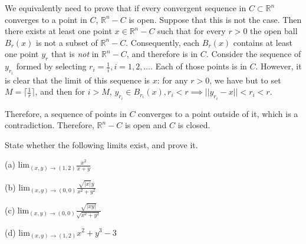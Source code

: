 \begin{solution}

    We equivalently need to prove that if every convergent sequence in $C \subset \mathbb{R}^n$ converges to a point in $C$, $\mathbb{R}^n - C$ is open. Suppose that this is not the case. Then there exists at least one point $x \in \mathbb{R}^n - C$ such that for every $r > 0$ the open ball $B_r(x)$ is not a subset of $\mathbb{R}^n - C$. Consequently, each $B_r(x)$ contains at least one point $y_r$ that is \textit{not} in $\mathbb{R}^n - C$, and therefore is in $C$. Consider the sequence of $y_{r_i}$ formed by selecting $r_i = \frac{1}{i}, i =1, 2, \ldots$. Each of those points is in $C$. However, it is clear that the limit of this sequence is $x$: for any $r > 0$, we have but to set $M = \lceil \frac{1}{r} \rceil$, and then for $i > M$, $y_{r_i} \in B_{r_i}(x), r_i < r \implies \lvert \lvert y_{r_i} - x \rvert \rvert < r_i < r$.

    Therefore, a sequence of points in $C$ converges to a point outside of it, which is a contradiction. Therefore, $\mathbb{R}^n - C$ is open and $C$ is closed.
\end{solution}

\begin{exercise}{14}
    State whether the following limits exist, and prove it.

    (a) $\text{lim}_{(x, y) \rightarrow (1, 2)} \frac{x^2}{x + y}$

    (b) $\text{lim}_{(x, y) \rightarrow (0, 0)} \frac{\sqrt{\lvert x \rvert}y}{x^2 + y^2}$

    (c) $\text{lim}_{(x, y) \rightarrow (0, 0)} \frac{\sqrt{\lvert x y \rvert}}{\sqrt{x^2 + y^2}}$

    (d) $\text{lim}_{(x, y) \rightarrow (1, 2)} x^2+y^3 - 3$
\end{exercise}

